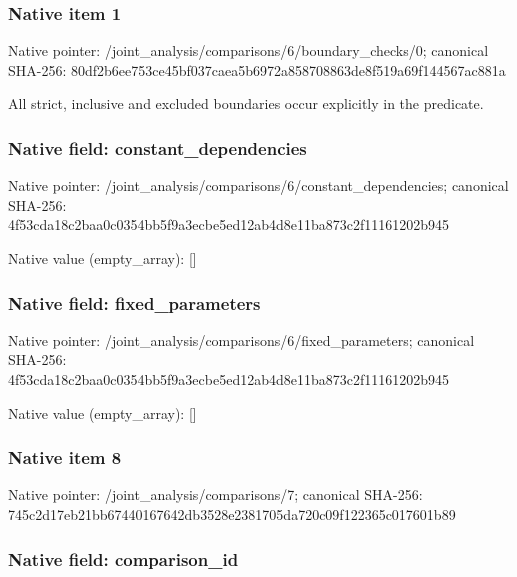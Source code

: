 \documentclass[10pt,a4paper]{article}
\begin{document}
\subsubsection{Native item 1}


Native pointer: /joint\_analysis/comparis\allowbreak{}ons/6/boundary\_checks/0; canonical SHA-256: 80df2b6ee753ce45bf037cae\allowbreak{}a5b6972a858708863de8f519\allowbreak{}a69f144567ac881a


All strict, inclusive and excluded boundaries occur explicitly in the predicate.


\subsubsection{Native field: constant\_dependencies}


Native pointer: /joint\_analysis/comparis\allowbreak{}ons/6/constant\_dependenc\allowbreak{}ies; canonical SHA-256: 4f53cda18c2baa0c0354bb5f\allowbreak{}9a3ecbe5ed12ab4d8e11ba87\allowbreak{}3c2f11161202b945



Native value (empty\_array): []



\subsubsection{Native field: fixed\_parameters}


Native pointer: /joint\_analysis/comparis\allowbreak{}ons/6/fixed\_parameters; canonical SHA-256: 4f53cda18c2baa0c0354bb5f\allowbreak{}9a3ecbe5ed12ab4d8e11ba87\allowbreak{}3c2f11161202b945



Native value (empty\_array): []



\subsubsection{Native item 8}


Native pointer: /joint\_analysis/comparisons/7; canonical SHA-256: 745c2d17eb21bb6744016764\allowbreak{}2db3528e2381705da720c09f\allowbreak{}122365c017601b89



\subsubsection{Native field: comparison\_id}
\end{document}
